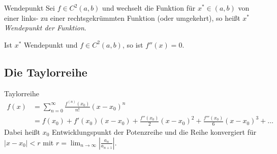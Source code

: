 \documentclass[german]{../spicker}
\renewcommand{\abs}[1]{\left| #1 \right|}
\begin{document}
\begin{defi}{Wendepunkt}
    Sei $f \in C^2(a, b)$ und wechselt die Funktion für $x^* \in (a, b)$ von einer links- zu einer rechtsgekrümmten Funktion (oder umgekehrt), so heißt $x^*$ \emph{Wendepunkt der Funktion}.

    Ist $x^*$ Wendepunkt und $f \in C^2(a, b)$, so ist $f''(x) = 0$.
\end{defi}

\subsection{Die Taylorreihe}

\begin{defi}{Taylorreihe}
    $$
        \begin{aligned}
            f(x) & = \sum^\infty_{n=0} \frac{f^{(n)}(x_0)}{n!} (x-x_0)^n                                           \\
                 & = f(x_0) + f'(x_0)(x-x_0) + \frac{f''(x_0)}{2}(x-x_0)^2 + \frac{f'''(x_0)}{6}(x-x_0)^3 + \ldots
        \end{aligned}
    $$
    Dabei heißt $x_0$ Entwicklungspunkt der Potenzreihe und die Reihe konvergiert für $\abs{x-x_0} < r$ mit $r = \lim_{n\to\infty}\abs{\frac{a_n}{a_{n+1}}}$.
\end{defi}
\end{document}
